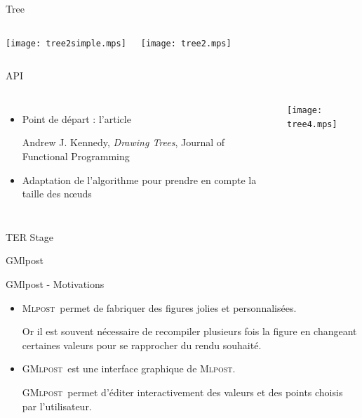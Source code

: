 \documentclass{beamer}
\newcommand{\mlpost}{\textsc{Mlpost}}
\newcommand{\gmlpost}{\textsc{GMlpost}}
\begin{document}
\begin{frame}{Tree}
  \begin{columns}
    \begin{center}
      \texttt{[image: tree2simple.mps]}
    \end{center}
    \begin{center}
      \texttt{[image: tree2.mps]}
    \end{center}
  \end{columns}
\end{frame}

\begin{frame}[fragile]{API}
  \begin{columns}
    \begin{itemize}
    \item Point de départ : l'article

      Andrew J. Kennedy, \textit{Drawing Trees}, Journal of Functional Programming 

    \item Adaptation de l'algorithme pour prendre en compte la taille
      des n\oe uds
    \end{itemize}

    \texttt{[image: tree4.mps]}
    \end{columns}
\end{frame}

\begin{frame}{TER Stage}
  \begin{center}
    \Huge{GMlpost}
  \end{center}
\end{frame}

\begin{frame}{GMlpost - Motivations}
  \begin{itemize}
  \item<1-> \mlpost\ permet de fabriquer des figures jolies et personnalisées.
  
  \bigskip
  
  Or il est souvent nécessaire de recompiler plusieurs fois la figure en changeant certaines valeurs pour se rapprocher du rendu souhaité. 

\bigskip

  \item<2->  \gmlpost\ est une interface graphique de \mlpost.

    \bigskip

    \gmlpost\ permet d'éditer interactivement des valeurs et des points choisis par l'utilisateur.

  \end{itemize}
\end{frame}
\end{document}
